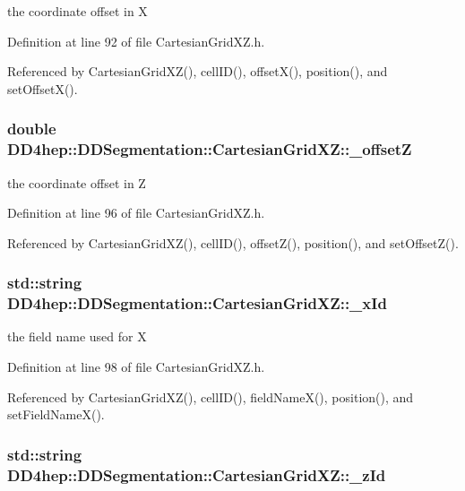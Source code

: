 the coordinate offset in X 

Definition at line 92 of file CartesianGridXZ.h.

Referenced by CartesianGridXZ(), cellID(), offsetX(), position(), and setOffsetX().\hypertarget{class_d_d4hep_1_1_d_d_segmentation_1_1_cartesian_grid_x_z_a2105d391f22a6e8f8d75b0ad85183c21}{
\subsubsection[{\_\-offsetZ}]{\setlength{\rightskip}{0pt plus 5cm}double {\bf DD4hep::DDSegmentation::CartesianGridXZ::\_\-offsetZ}}}
\label{class_d_d4hep_1_1_d_d_segmentation_1_1_cartesian_grid_x_z_a2105d391f22a6e8f8d75b0ad85183c21}


the coordinate offset in Z 

Definition at line 96 of file CartesianGridXZ.h.

Referenced by CartesianGridXZ(), cellID(), offsetZ(), position(), and setOffsetZ().\hypertarget{class_d_d4hep_1_1_d_d_segmentation_1_1_cartesian_grid_x_z_a49e0f437dc9ab286e9d916dc85d8309a}{
\subsubsection[{\_\-xId}]{\setlength{\rightskip}{0pt plus 5cm}std::string {\bf DD4hep::DDSegmentation::CartesianGridXZ::\_\-xId}}}
\label{class_d_d4hep_1_1_d_d_segmentation_1_1_cartesian_grid_x_z_a49e0f437dc9ab286e9d916dc85d8309a}


the field name used for X 

Definition at line 98 of file CartesianGridXZ.h.

Referenced by CartesianGridXZ(), cellID(), fieldNameX(), position(), and setFieldNameX().\hypertarget{class_d_d4hep_1_1_d_d_segmentation_1_1_cartesian_grid_x_z_aa90fc4531dd5884afcc2c6c2a824ce18}{
\subsubsection[{\_\-zId}]{\setlength{\rightskip}{0pt plus 5cm}std::string {\bf DD4hep::DDSegmentation::CartesianGridXZ::\_\-zId}}}
\label{class_d_d4hep_1_1_d_d_segmentation_1_1_cartesian_grid_x_z_aa90fc4531dd5884afcc2c6c2a824ce18}


